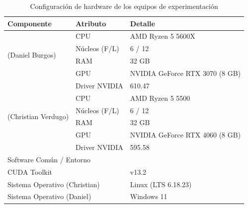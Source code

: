 \begin{table}[H]
  \centering
  \caption{Configuración de hardware de los equipos de experimentación}
  \label{tab:hardware_multi}
  \begin{tabular}{lll}
    \toprule
    \textbf{Componente} & \textbf{Atributo} & \textbf{Detalle} \\
    \midrule
    \multirow{4}{*}{(Daniel Burgos)} & CPU & AMD Ryzen 5 5600X \\
                                          & Núcleos (F/L) & 6 / 12 \\
                                          & RAM & 32 GB \\
                                          & GPU & NVIDIA GeForce RTX 3070 (8 GB) \\
                                          & {Driver NVIDIA} & 610.47 \\
    \midrule
    \multirow{4}{*}{(Christian Verdugo)}  & CPU & AMD Ryzen 5 5500 \\
                                           & Núcleos (F/L) & 6 / 12 \\
                                           & RAM & 32 GB \\
                                           & GPU & NVIDIA GeForce RTX 4060 (8 GB) \\
                                           & {Driver NVIDIA} & 595.58 \\
    \midrule
    \multicolumn{2}{l}{Software Común / Entorno} & \\
    \midrule
    \multicolumn{2}{l}{CUDA Toolkit} & v13.2 \\
    \multicolumn{2}{l}{Sistema Operativo (Christian)} & Linux (LTS 6.18.23) \\
    \multicolumn{2}{l}{Sistema Operativo (Daniel)} & Windows 11 \\
    \bottomrule
  \end{tabular}
\end{table}